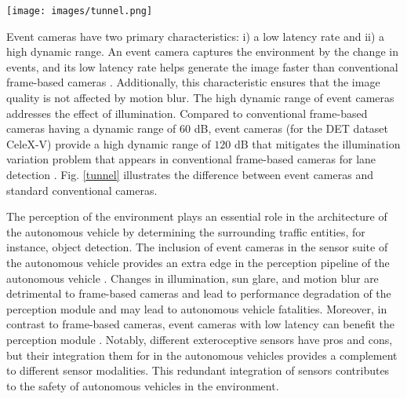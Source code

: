 \documentclass[journal]{IEEEtran}
\begin{document}
\begin{figure*}[t]
      \centering
      \texttt{[image: images/tunnel.png]}
\caption{A sequence of images captured while coming out of a tunnel (T1-T2-T3-T4-T5). The top row shows the grayscale images, and the bottom row shows the corresponding event camera images. RGB cameras are highly affected by illumination variations due to their low dynamic range. The figure is borrowed from \cite{Cheng2019} to illustrate the difference between event cameras and frame-based RGB cameras.}
      \label{tunnel}
\end{figure*}
Event cameras have two primary characteristics: i) a low latency rate and ii) a high dynamic range. An event camera captures the environment by the change in events, and its low latency rate helps generate the image faster than conventional frame-based cameras \cite{Gallego2019}. Additionally, this characteristic ensures that the image quality is not affected by motion blur. The high dynamic range of event cameras addresses the effect of illumination. Compared to conventional frame-based cameras having a dynamic range of $60$ dB, event cameras (for the DET dataset CeleX-V) provide a high dynamic range of $120$ dB that mitigates the illumination variation problem that appears in conventional frame-based cameras for lane detection \cite{Gallego2019} \cite{Mueggler2017}. Fig. \ref{tunnel} illustrates the difference between event cameras and standard conventional cameras.
\par 
 The perception of the environment plays an essential role in the architecture of the autonomous vehicle by determining the surrounding traffic entities, for instance, object detection. The inclusion of event cameras in the sensor suite of the autonomous vehicle provides an extra edge in the perception pipeline of the autonomous vehicle \cite{Chen}. Changes in illumination, sun glare, and motion blur are detrimental to frame-based cameras and lead to performance degradation of the perception module and may lead to autonomous vehicle fatalities. Moreover, in contrast to frame-based cameras, event cameras with low latency can benefit the perception module \cite{Gallego2019}. Notably, different exteroceptive sensors have pros and cons, but their integration them for in the autonomous vehicles provides a complement to different sensor modalities. This redundant integration of sensors contributes to the safety of autonomous vehicles in the environment.
\end{document}
